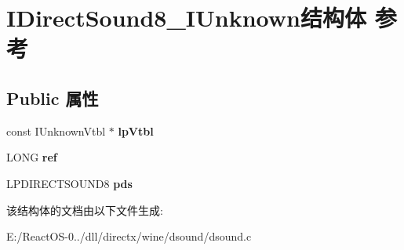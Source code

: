 \hypertarget{struct_i_direct_sound8___i_unknown}{}\section{I\+Direct\+Sound8\+\_\+\+I\+Unknown结构体 参考}
\label{struct_i_direct_sound8___i_unknown}
\subsection*{Public 属性}
\begin{DoxyCompactItemize}
\item 
\mbox{\label{struct_i_direct_sound8___i_unknown_a6a0e08f2c0a087b80cb80b659d474787}} 
const I\+Unknown\+Vtbl $\ast$ {\bfseries lp\+Vtbl}
\item 
\mbox{\label{struct_i_direct_sound8___i_unknown_ae9be43059dc0f9bba20b81d6473e111b}} 
L\+O\+NG {\bfseries ref}
\item 
\mbox{\label{struct_i_direct_sound8___i_unknown_af7fa81762cf28994332c5efb70508690}} 
L\+P\+D\+I\+R\+E\+C\+T\+S\+O\+U\+N\+D8 {\bfseries pds}
\end{DoxyCompactItemize}


该结构体的文档由以下文件生成\+:\begin{DoxyCompactItemize}
\item 
E\+:/\+React\+O\+S-\/0../dll/directx/wine/dsound/dsound.\+c\end{DoxyCompactItemize}
